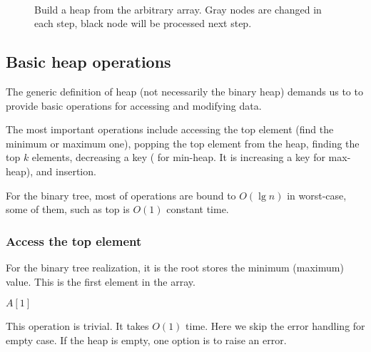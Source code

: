 \documentclass{article}
\begin{document}
\begin{figure}[htbp]
    \centering
     \\
    \caption{Build a heap from the arbitrary array. Gray nodes are changed in each step,
black node will be processed next step.} \label{fig:build-heap-3}
\end{figure}

\subsection{Basic heap operations}

The generic definition of heap (not necessarily the binary heap)
demands us to to provide basic operations for accessing and modifying data.

The most important operations include accessing the top element
(find the minimum or maximum one), popping the top element
from the heap, finding the top $k$ elements, decreasing a key (
for min-heap. It is increasing a key for max-heap), and
insertion.

For the binary tree, most of operations are bound to $O(\lg n)$ in
worst-case, some of them, such as top is $O(1)$ constant time.

\subsubsection{Access the top element}
For the binary tree realization, it is the
root stores the minimum (maximum) value. This is the first
element in the array.

\begin{algorithmic}[1]
  \State \Return $A[1]$
\EndFunction
\end{algorithmic}

This operation is trivial. It takes $O(1)$ time.
Here we skip the error handling for empty case. If the
heap is empty, one option is to raise an error.
\end{document}
